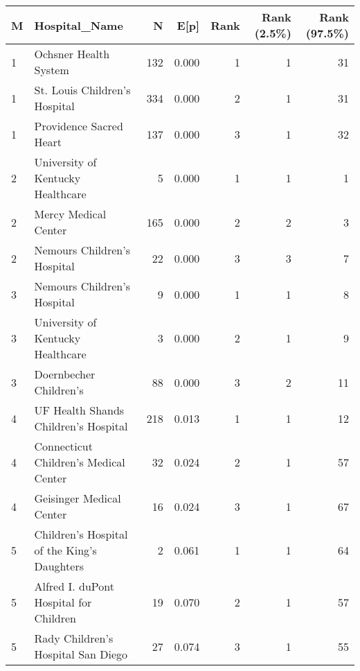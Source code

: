 \begin{tabular}{llrrrrr}
  \hline
M & Hospital\_Name & N & E[p] & Rank & Rank (2.5\%) & Rank (97.5\%) \\ 
  \hline
1 & Ochsner Health System & 132 & 0.000 & 1 & 1 & 31 \\ 
  1 & St. Louis Children's Hospital & 334 & 0.000 & 2 & 1 & 31 \\ 
  1 & Providence Sacred Heart & 137 & 0.000 & 3 & 1 & 32 \\ 
  2 & University of Kentucky Healthcare & 5 & 0.000 & 1 & 1 & 1 \\ 
  2 & Mercy Medical Center & 165 & 0.000 & 2 & 2 & 3 \\ 
  2 & Nemours Children's Hospital & 22 & 0.000 & 3 & 3 & 7 \\ 
  3 & Nemours Children's Hospital & 9 & 0.000 & 1 & 1 & 8 \\ 
  3 & University of Kentucky Healthcare & 3 & 0.000 & 2 & 1 & 9 \\ 
  3 & Doernbecher Children's & 88 & 0.000 & 3 & 2 & 11 \\ 
  4 & UF Health Shands Children's Hospital & 218 & 0.013 & 1 & 1 & 12 \\ 
  4 & Connecticut Children's Medical Center & 32 & 0.024 & 2 & 1 & 57 \\ 
  4 & Geisinger Medical Center & 16 & 0.024 & 3 & 1 & 67 \\ 
  5 & Children's Hospital of the King's Daughters & 2 & 0.061 & 1 & 1 & 64 \\ 
  5 & Alfred I. duPont Hospital for Children & 19 & 0.070 & 2 & 1 & 57 \\ 
  5 & Rady Children's Hospital San Diego & 27 & 0.074 & 3 & 1 & 55 \\ 
   \hline
\end{tabular}
